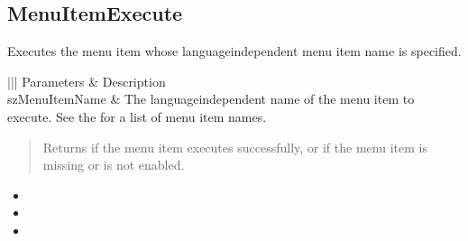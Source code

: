 \documentclass[letterpaper,12pt,english,openany,oneside]{sphinxmanual}
\begin{document}
\subsection{MenuItemExecute}
\label{\detokenize{IAC_API_OLE_Objects:menuitemexecute}}
Executes the menu item whose language\sphinxhyphen{}independent menu item name is specified.


\begin{sphinxVerbatim}[commandchars=\\\{\}]
  
\end{sphinxVerbatim}
\label{\detokenize{IAC_API_OLE_Objects:parameters-7}}


\begin{savenotes}\sphinxattablestart
\centering
{}\label{\detokenize{IAC_API_OLE_Objects:section-9}}\nobreak
\begin{tabular}[t]{|||}
\hline
\sphinxstyletheadfamily 
Parameters
&\sphinxstyletheadfamily 
Description
\\
\hline
szMenuItemName
&
The language\sphinxhyphen{}independent name of the menu item to execute. See the  for a list of menu item names.
\\
\hline
\end{tabular}
\par
\sphinxattableend\end{savenotes}

\begin{quote}

Returns  if the menu item executes successfully, or  if the menu item is missing or is not enabled.
\end{quote}
\label{\detokenize{IAC_API_OLE_Objects:related-methods-14}}
\begin{itemize}
\item {} 
 

\item {} 
 

\item {} 
 

\end{itemize}
\end{document}
